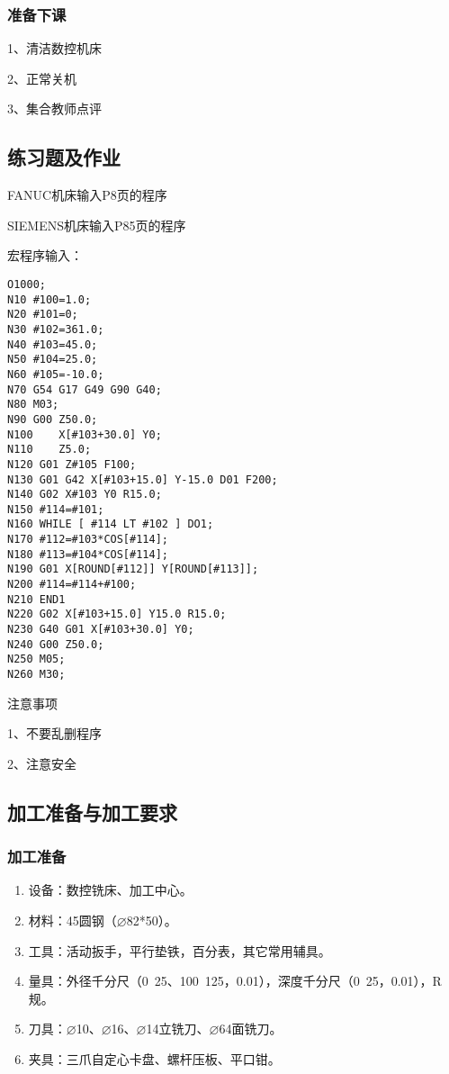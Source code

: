 \subsubsection{准备下课}
1、清洁数控机床

2、正常关机

3、集合教师点评

\subsection{练习题及作业}
FANUC机床输入P8页的程序

SIEMENS机床输入P85页的程序

宏程序输入：

\begin{lstlisting}
O1000;
N10 #100=1.0;
N20 #101=0;
N30 #102=361.0;
N40 #103=45.0;
N50 #104=25.0;
N60 #105=-10.0;
N70 G54 G17 G49 G90 G40;
N80 M03;
N90 G00 Z50.0;
N100    X[#103+30.0] Y0;
N110    Z5.0;
N120 G01 Z#105 F100;
N130 G01 G42 X[#103+15.0] Y-15.0 D01 F200;
N140 G02 X#103 Y0 R15.0;
N150 #114=#101;
N160 WHILE [ #114 LT #102 ] DO1;
N170 #112=#103*COS[#114];
N180 #113=#104*COS[#114];
N190 G01 X[ROUND[#112]] Y[ROUND[#113]];
N200 #114=#114+#100;
N210 END1
N220 G02 X[#103+15.0] Y15.0 R15.0;
N230 G40 G01 X[#103+30.0] Y0;
N240 G00 Z50.0;
N250 M05;
N260 M30;

\end{lstlisting}
注意事项

1、不要乱删程序

2、注意安全


\vfill
\subsection{加工准备与加工要求}
\subsubsection{加工准备}
\begin{enumerate}[1、]
\item 设备：数控铣床、加工中心。
\item 材料：45圆钢（$\varnothing$82*50）。
\item  工具：活动扳手，平行垫铁，百分表，其它常用辅具。
\item  
量具：外径千分尺（0~25、100~125，0.01），深度千分尺（0~25，0.01），R规。
\item  刀具：$\varnothing$10、$\varnothing$16、$\varnothing$14立铣刀、$\varnothing$64面铣刀。
\item  夹具：三爪自定心卡盘、螺杆压板、平口钳。
\end{enumerate}
